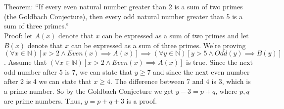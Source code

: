 \documentclass{article}
\begin{document}
\section{}

Theorem: ``If every even natural number greater than 2 is a sum of two primes
(the Goldbach Conjecture), then every odd natural number greater than 5 is a sum
of three primes.''
\\
Proof: let $A(x)$ denote that $x$ can be expressed as a sum of two primes and
let $B(x)$ denote that $x$ can be expressed as a sum of three primes. We're
proving $(\forall x \in \mathbb{N})[x > 2 \wedge Even(x) \implies A(x)] \implies
(\forall y \in \mathbb{N})[y > 5 \wedge Odd(y) \implies B(y)]$.  Assume that
$(\forall x \in \mathbb{N})[x > 2 \wedge Even(x) \implies A(x)]$ is true. Since
the next odd number after 5 is 7, we can state that $y \geq 7$ and since the
next even number after 2 is 4 we can state that $x \geq 4$. The difference between
7 and 4 is 3, which is a prime number. So by the Goldbach Conjecture we get
$y - 3 = p + q$, where $p, q$ are prime numbers. Thus, $y = p + q + 3$ is a proof.
\end{document}
